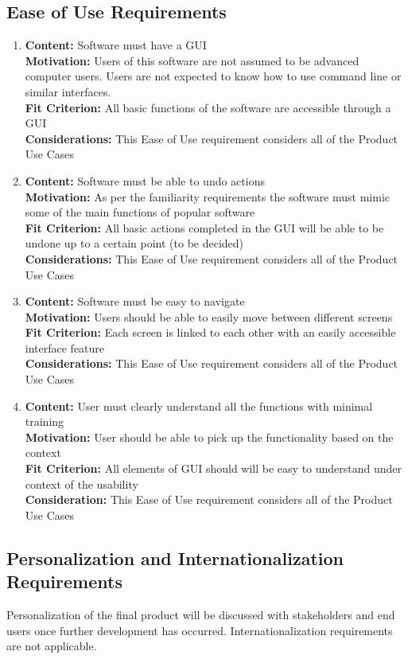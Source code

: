 \documentclass[paper=letter, fontsize=10pt]{scrartcl}
\numberwithin{equation}{section}		%
\numberwithin{figure}{section}			%
\numberwithin{table}{section}				%
\begin{document}
\subsection{Ease of Use Requirements}
\begin{enumerate}
	\item \textbf{Content:} Software must have a GUI
	\\	  \textbf{Motivation:} Users of this software are not assumed to be advanced computer users. Users are not expected to know how to use command line or similar interfaces. 
	\\	  \textbf{Fit Criterion:} All basic functions of the software are accessible through a GUI
	\\	  \textbf{Considerations:} This Ease of Use requirement considers all of the Product Use Cases
	\item \textbf{Content:} Software must be able to undo actions
	\\	  \textbf{Motivation:} As per the familiarity requirements the software must mimic some of the main functions of popular software
	\\	  \textbf{Fit Criterion:} All basic actions completed in the GUI will be able to be undone up to a certain point (to be decided)
	\\	  \textbf{Considerations:} This Ease of Use requirement considers all of the Product Use Cases
	\item \textbf{Content:} Software must be easy to navigate
	\\	  \textbf{Motivation:} Users should be able to easily move between different screens
	\\	  \textbf{Fit Criterion:} Each screen is linked to each other with an easily accessible interface feature
	\\	  \textbf{Considerations:} This Ease of Use requirement considers all of the Product Use Cases
	\item \textbf{Content:} User must clearly understand all the functions with minimal training
	\\	  \textbf{Motivation:} User should be able to pick up the functionality based on the context
	\\	  \textbf{Fit Criterion:} All elements of GUI should will be easy to understand under context of the usability
	\\	  \textbf{Consideration:} This Ease of Use requirement considers all of the Product Use Cases
\end{enumerate}
\subsection{Personalization and Internationalization Requirements}
Personalization of the final product will be discussed with stakeholders and end users once further development has occurred. Internationalization requirements are not applicable.
\end{document}
